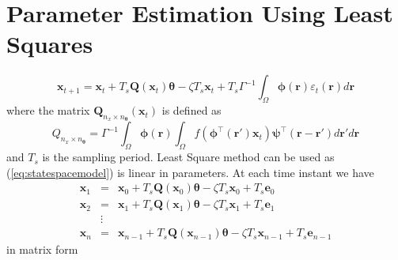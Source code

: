 \documentclass[12pt]{iopart}
\begin{document}
\section{Parameter Estimation Using Least Squares}\label{LeastSquaresAppendix} 
\begin{equation}
	\mathbf x_{t+1}=\mathbf{x}_{t}+T_s \mathbf{Q}(\mathbf{x}_t)\boldsymbol{\theta}-\zeta T_s\mathbf{x}_t+T_s\Gamma^{-1}\int_\Omega\boldsymbol{\phi}(\mathbf r)\varepsilon_t(\mathbf r)d\mathbf r \label{eq:statespacemodel} 
\end{equation}
where the matrix $\mathbf Q_{n_x \times n_{\boldsymbol{\theta}}}(\mathbf x_t)$ is defined as 
\begin{equation}
	Q_{n_x \times n_{\boldsymbol{\theta}}}=\Gamma^{-1}\int_\Omega\boldsymbol{\phi}(\mathbf r)\int_\Omega f(\boldsymbol{\phi}^\top(\mathbf r')\mathbf x_t)\mathbf{\psi}^\top(\mathbf r-\mathbf r')d\mathbf r'd\mathbf r 
\end{equation}
and $T_s$ is the sampling period. Least Square method can be used as (\ref{eq:statespacemodel}) is linear in parameters. At each time instant we have 
\begin{eqnarray}
	\mathbf x_{1}&=&\mathbf x_{0}+T_s \mathbf Q(\mathbf x_0) \boldsymbol{\theta}-\zeta T_s\mathbf x_0+T_s\mathbf e_0 \nonumber \\
	\mathbf x_{2}&=&\mathbf x_{1}+T_s \mathbf Q(\mathbf x_1) \boldsymbol{\theta}-\zeta T_s\mathbf x_1+T_s\mathbf e_1\nonumber\\
	&\vdots& \nonumber\\
	\mathbf x_{n}&=&\mathbf x_{n-1}+T_s \mathbf Q(\mathbf x_{n-1}) \boldsymbol{\theta}-\zeta T_s\mathbf x_{n-1}+T_s\mathbf e_{n-1} 
\end{eqnarray}
in matrix form 
\end{document}
